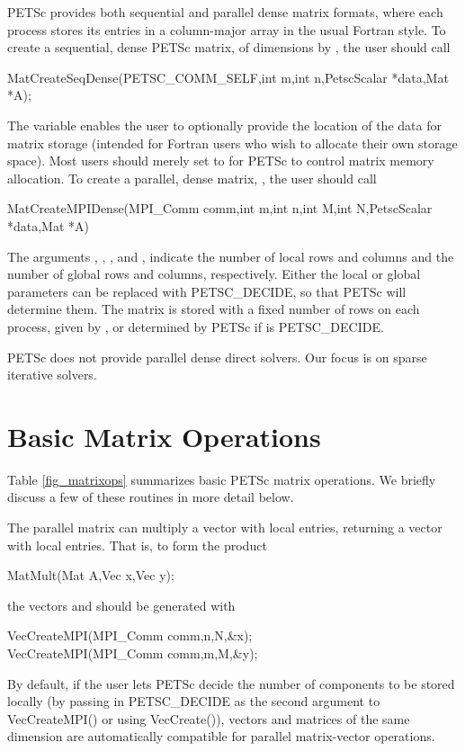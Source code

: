 PETSc provides both sequential and parallel dense matrix formats,
where each process stores its entries in a column-major array in the
usual Fortran style.  To create a sequential, dense PETSc matrix,
 of dimensions  by , the user should
call 
\begin{tabbing}
  MatCreateSeqDense(PETSC\_COMM\_SELF,int m,int n,PetscScalar *data,Mat *A);
\end{tabbing}
The variable  enables the user to optionally provide the
location of the data for matrix storage (intended for Fortran users who
wish to allocate their own storage space).  Most users should merely
set  to  for PETSc to control matrix memory allocation.
To create a parallel, dense matrix, , the user should call
\begin{tabbing}
  MatCreateMPIDense(MPI\_Comm comm,int m,int n,int M,int N,PetscScalar *data,Mat *A)
\end{tabbing}
The arguments , , 
, and , indicate the number of local rows and columns and
the number of global rows and columns, respectively. Either the local or
global parameters can be replaced with PETSC\_DECIDE, so that 
PETSc will determine  them.
The matrix is stored with a fixed number of rows on 
each process, given by , or determined by PETSc if  is
PETSC\_DECIDE. 

PETSc does not provide parallel dense direct solvers. Our focus is on 
sparse iterative solvers.

\section{Basic Matrix Operations}
\label{sec_matoptions}

Table \ref{fig_matrixops} summarizes basic PETSc matrix operations.
We briefly discuss a few of these routines in more detail below.

The parallel matrix can multiply a vector with  
local entries, returning a vector with  local entries. That is, 
to form the product 
\begin{tabbing}
  MatMult(Mat A,Vec x,Vec y);
\end{tabbing}
the vectors  and  should be generated with 
\begin{tabbing}
  VecCreateMPI(MPI\_Comm comm,n,N,\&x);\\
  VecCreateMPI(MPI\_Comm comm,m,M,\&y);
\end{tabbing}
By default, if the user lets PETSc decide the number of components to
be stored locally (by passing in PETSC\_DECIDE as the second
argument to VecCreateMPI() or using VecCreate()), vectors
and matrices of the same dimension are automatically compatible for
parallel matrix-vector operations.

